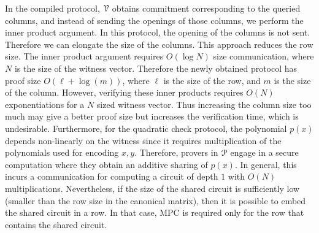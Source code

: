 In the compiled protocol, $\mathcal{V}$ obtains commitment corresponding to the queried columns, and instead of sending the openings of those columns, we perform the inner product argument. In this protocol, the opening of the columns is not sent. Therefore we can elongate the size of the columns. This approach reduces the row size. The inner product argument requires $O(\log N)$ size communication, where $N$ is the size of the witness vector. Therefore the newly obtained protocol has proof size $O(\ell + \log (m))$, where $\ell$ is the size of the row, and $m$ is the size of the column. However, verifying these inner products requires $O(N)$ exponentiations for a $N$ sized witness vector. Thus increasing the column size too much may give a better proof size but increases the verification time, which is undesirable.
Furthermore, for the quadratic check protocol, the polynomial $p(x)$ depends non-linearly on the witness since it requires multiplication of the polynomials used for encoding $x, y$. Therefore, provers in $\mathcal{P}$ engage in a secure computation where they obtain an additive sharing of $p(x)$. In general, this incurs a communication for computing a circuit of depth $1$ with $O(N)$ multiplications. Nevertheless, if the size of the shared circuit is sufficiently low (smaller than the row size in the canonical matrix), then it is possible to embed the shared circuit in a row. In that case, MPC is required only for the row that contains the shared circuit.

